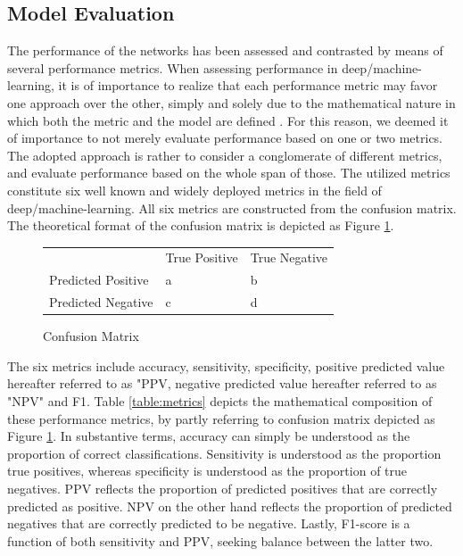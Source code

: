 \documentclass[12pt]{article}
\begin{document}
\clearpage
\subsection{Model Evaluation}
The performance of the networks has been assessed and contrasted by means of several performance metrics. When assessing performance in deep/machine-learning, it is of importance to realize that each performance metric may favor one approach over the other, simply and solely due to the mathematical nature in which both the metric and the model are defined \cite{gunawardana2009survey}. For this reason, we deemed it of importance to not merely evaluate performance based on one or two metrics. The adopted approach is rather to consider a conglomerate of different metrics, and evaluate performance based on the whole span of those. The utilized metrics constitute six well known and widely deployed metrics in the field of deep/machine-learning. All six metrics are constructed from the confusion matrix. The theoretical format of the confusion matrix is depicted as Figure \ref{fig:confusion}.

\bigskip
\bgroup
\def\arraystretch{1.6}%
\begin{figure}[h]
\caption{Confusion Matrix}
\label{fig:confusion}
\begin{tabular}{lll}
                                        & True Positive          & True Negative          \\ \cline{2-3} 
\multicolumn{1}{l|}{Predicted Positive} & \multicolumn{1}{l|}{a} & \multicolumn{1}{l|}{b} \\ \cline{2-3} 
\multicolumn{1}{l|}{Predicted Negative} & \multicolumn{1}{l|}{c} & \multicolumn{1}{l|}{d} \\ \cline{2-3} 
\end{tabular}
\end{figure}
\egroup
\bigskip

The six metrics include accuracy, sensitivity, specificity, positive predicted value hereafter referred to as "PPV, negative predicted value hereafter referred to as "NPV" and F1. Table \ref{table:metrics} depicts the mathematical composition of these performance metrics, by partly referring to confusion matrix depicted as Figure \ref{fig:confusion}. In substantive terms, accuracy can simply be understood as the proportion of correct classifications. Sensitivity is understood as the proportion true positives, whereas specificity is understood as the proportion of true negatives. PPV reflects the proportion of predicted positives that are correctly predicted as positive. NPV on the other hand reflects the proportion of predicted negatives that are correctly predicted to be negative. Lastly, F1-score is a function of both sensitivity and PPV, seeking balance between the latter two. 
\end{document}
